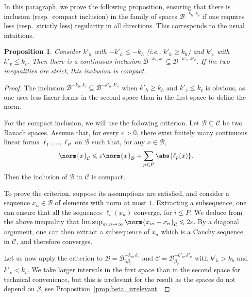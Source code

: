 \documentclass[11pt, a4paper, oneside, final, pagebackref]{amsart}
\newcommand{\boC}{\mathcal{C}}
\newcommand{\boB}{\mathcal{B}}
\renewcommand{\epsilon}{\varepsilon}
\renewcommand{\leq}{\leqslant}
\renewcommand{\geq}{\geqslant}
\newtheorem{prop}[thm]{Proposition}
\theoremstyle{definition}
\numberwithin{equation}{section}
\begin{document}
In this paragraph, we prove the following proposition, ensuring that there
is inclusion (resp.\ compact inclusion) in the family of spaces $\boB^{-k_h, k_v}$
if one requires less (resp.\ strictly less) regularity in all directions.
This corresponds to the usual intuitions.

\begin{prop}
\label{prop:compact_inclusion} Consider $k'_h$ with $-k'_h \leq -k_h$ (i.e.,
$k'_h \geq k_h$) and $k'_v$ with $k'_v \leq k_v$. Then there is a continuous
inclusion $\boB^{-k_h, k_v} \subseteq \boB^{-k'_h, k'_v}$. If the two
inequalities are strict, this inclusion is compact.
\end{prop}
\begin{proof}
The inclusion $\boB^{-k_h, k_v} \subseteq \boB^{-k'_u, k'_v}$ when $k'_h \geq
k_h$ and $k'_v \leq k_v$ is obvious, as one uses less linear forms in the
second space than in the first space to define the norm.

For the compact inclusion, we will use the following criterion. Let $\boB
\subseteq \boC$ be two Banach spaces. Assume that, for every $\epsilon>0$,
there exist finitely many continuous linear forms $\ell_1,\dotsc,\ell_P$ on
$\boB$ such that, for any $x \in \boB$,
\begin{equation}
\label{eq:critere_compacite}
  \norm{x}_{\boC} \leq \epsilon \norm{x}_{\boB} + \sum_{p \leq P} \abs{\ell_p(x)}.
\end{equation}
Then the inclusion of $\boB$ in $\boC$ is compact.

To prove the criterion, suppose its assumptions are satisfied, and consider a
sequence $x_n \in \boB$ of elements with norm at most $1$. Extracting a
subsequence, one can ensure that all the sequences $\ell_i(x_n)$ converge,
for $i\leq P$. We deduce from the above inequality that $\limsup_{m,n\to
\infty} \norm{x_m -x_n}_{\boC} \leq 2 \epsilon$. By a diagonal argument, one
can then extract a subsequence of $x_n$ which is a Cauchy sequence in $\boC$,
and therefore converges.

Let us now apply the criterion to $\boB = \boB^{-k_h, k_v}_{5\beta_0}$ and
$\boC = \boB^{-k'_h, k'_v}_{\beta_0}$ with $k'_h>k_h$ and $k'_v<k_v$. We take
larger intervals in the first space than in the second space for technical
convenience, but this is irrelevant for the result as the spaces do not
depend on $\beta$, see Proposition~\ref{prop:beta_irrelevant}.


\end{proof}
\end{document}
